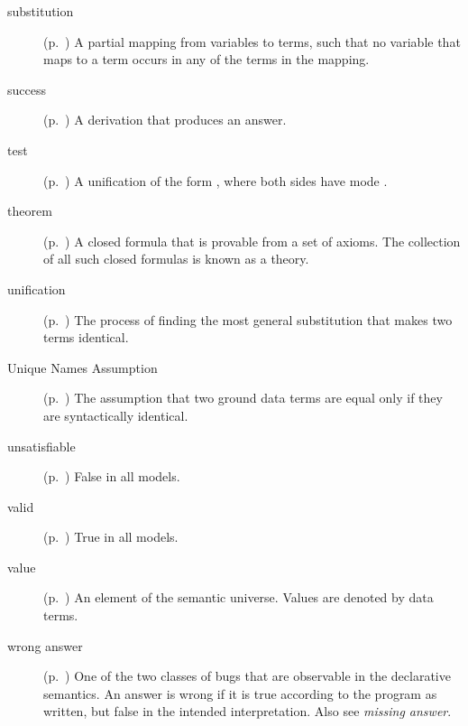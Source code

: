 \begin{description}
\item[substitution]
(p.~\pageref{gi:substitution})
A partial mapping from variables to terms,
such that no variable that maps to a term
occurs in any of the terms in the mapping.

\item[success]
(p.~\pageref{gi:success})
A derivation that produces an answer.

\item[test]
(p.~\pageref{gi:test})
A unification of the form ,
where both sides have mode .

\item[theorem]
(p.~\pageref{gi:theorem})
A closed formula that is provable from a set of axioms.
The collection of all such closed formulas is known as a theory.

\item[unification]
(p.~\pageref{sec:unification})
The process of finding the most general substitution
that makes two terms identical.

\item[Unique Names Assumption]
(p.~\pageref{gi:una})
The assumption that two ground data terms are equal
only if they are syntactically identical.

\item[unsatisfiable]
(p.~\pageref{gi:unsatisfiable})
False in all models.

\item[valid]
(p.~\pageref{gi:valid})
True in all models.

\item[value]
(p.~\pageref{gi:value})
An element of the semantic universe.
Values are denoted by data terms.

\item[wrong answer]
(p.~\pageref{gi:wrong-answer})
One of the two classes of bugs
that are observable in the declarative semantics.
An answer is wrong if it is true according to the program as written,
but false in the intended interpretation.
Also see \emph{missing answer}.

\end{description}
